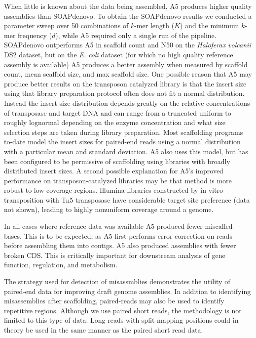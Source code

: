 \documentclass{bioinfo}
\begin{document}
When little is known about the data being assembled, A5 produces higher quality assemblies 
than SOAPdenovo. To obtain the SOAPdenovo results we conducted a parameter sweep 
over 50 combinations of $k$-mer length ($K$) and the minimum $k$-mer frequency ($d$), while A5 required
only a single run of the pipeline.
SOAPdenovo outperforms A5 in scaffold count and N50 on the \textit{Haloferax volcanii} DS2 dataset, but on the \textit{E. coli} dataset 
(for which no high quality reference assembly is available) 
A5 produces a better assembly when measured by scaffold count, mean scaffold size, and max scaffold size.
One possible reason that A5 may produce better results on the transposon catalyzed library is that the insert size using
that library preparation protocol often does not fit a normal distribution.  Instead the insert size 
distribution depends greatly on the relative concentrations of transposase and target DNA and can range from a truncated uniform
to roughly lognormal depending on the enzyme concentration and what size selection steps are taken during library preparation.
Most scaffolding programs to-date model the insert sizes for paired-end reads using a normal distribution with a particular
mean and standard deviation. A5 also uses this model, but has been configured to be permissive of scaffolding
using libraries with broadly distributed insert sizes.  A second possible explanation for A5's improved performance on transposon-catalyzed 
libraries may be that method is more robust to low coverage regions.  Illumina libraries constructed by in-vitro 
transposition with Tn5 transposase have considerable target site preference (data not shown), leading to highly nonuniform coverage around a genome.

In all cases where reference data was available A5 produced fewer miscalled bases. This is to
be expected, as A5 first performs error correction on reads before assembling them into contigs. A5 also produced assemblies
with fewer broken CDS. This is critically important for downstream analysis of gene function, regulation, and metabolism.


The strategy used for detection of misassmblies demonstrates the utility of paired-end data for improving draft genome assemblies.
In addition to identifying misassemblies after scaffolding, paired-reads may also be used to identify repetitive regions.   
Although we use paired short reads, the methodology is not limited to this type of data. Long reads with split mapping positions 
could in theory be used in the same manner as the paired short read data.
\end{document}
